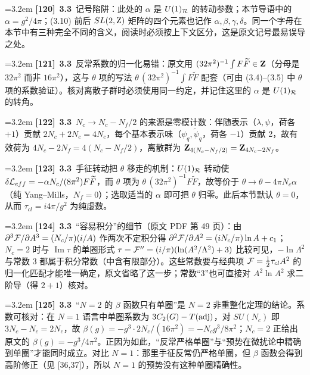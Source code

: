 \par
\par\medskip\noindent\hangindent=3.2em \textbf{[120]}~\textbf{3.3}~记号陷阱：此处的 $\alpha$ 是 $U(1)_{\cal R}$ 的转动参数；本节导语中的 $\alpha=g^2/4\pi$；(3.10) 前后 $SL(2,{\rm Z})$ 矩阵的四个元素也记作 $\alpha,\beta,\gamma,\delta$。同一个字母在本节中有三种完全不同的含义，阅读时必须按上下文区分，这是原文记号最易误导之处。
\par
\par\medskip\noindent\hangindent=3.2em \textbf{[121]}~\textbf{3.3}~反常系数的归一化易错：原文用 $(32\pi^2)^{-1}\int F\widetilde F\in{\bf Z}$（分母是 $32\pi^2$ 而非 $16\pi^2$），这与 $\theta$ 项的写法 $\theta\,(32\pi^2)^{-1}\int F\widetilde F$ 配套（可由 (3.4)--(3.5) 中 $\theta$ 项的系数验证）。核对离散子群时必须使用同一约定，并记住这里的 $\alpha$ 是 $U(1)_{\cal R}$ 的转角。
\par
\par\medskip\noindent\hangindent=3.2em \textbf{[122]}~\textbf{3.3}~$N_c\to N_c-N_f/2$ 的来源是零模计数：伴随表示（$\lambda,\psi$，荷各 $+1$）贡献 $2N_c+2N_c=4N_c$，每个基本表示味（$\psi_q,\widetilde\psi_q$，荷各 $-1$）贡献 2，故有效荷为 $4N_c-2N_f=4(N_c-N_f/2)$，离散群为 ${\bf Z}_{4(N_c-N_f/2)}={\bf Z}_{4N_c-2N_f}$。
\par
\par\medskip\noindent\hangindent=3.2em \textbf{[123]}~\textbf{3.3}~手征转动把 $\theta$ 移走的机制：$U(1)_{\cal R}$ 转动使 $\delta{\cal L}_{eff}=-\alpha N_c/(8\pi^2)F\widetilde F$，而 $\theta$ 项为 $\theta\,(32\pi^2)^{-1}F\widetilde F$，故等价于 $\theta\to\theta-4\pi N_c\alpha$（纯 Yang--Mills，$N_f=0$）；选取适当的 $\alpha$ 即可把 $\theta$ 归零。此后本节默认 $\theta=0$，从而 $\tau_{cl}=i4\pi/g^2$ 为纯虚数。
\par
\par\medskip\noindent\hangindent=3.2em \textbf{[124]}~\textbf{3.3}~“容易积分”的细节（原文 PDF 第 49 页）：由 $\partial^3{\cal F}/\partial A^3=(N_c/\pi)(i/A)$ 作两次不定积分得 $\partial^2{\cal F}/\partial A^2=(iN_c/\pi)\ln A+c_1$；$N_c=2$ 时与 $\operatorname{Im}\tau$ 的单圈形式 $\tau={\cal F}''=(i/\pi)(\ln(A^2/\Lambda^2)+3)$ 比较可见，$-\ln\Lambda^2$ 与常数 3 都属于积分常数（中含有限部分）。这些常数要与经典项 ${\cal F}=\frac12\tau_{cl}A^2$ 的归一化匹配才能唯一确定，原文省略了这一步；常数“3”也可直接对 $A^2\ln A^2$ 求二阶导（得 $2+1$）核对。
\par
\par\medskip\noindent\hangindent=3.2em \textbf{[125]}~\textbf{3.3}~“$N=2$ 的 $\beta$ 函数只有单圈”是 $N=2$ 非重整化定理的结论。系数可核对：在 $N=1$ 语言中单圈系数为 $3C_2(G)-T({\rm adj})$，对 $SU(N_c)$ 即 $3N_c-N_c=2N_c$，故 $\beta(g)=-g^3\cdot 2N_c/(16\pi^2)=-N_c g^3/8\pi^2$；$N_c=2$ 正给出原文的 $\beta(g)=-g^3/4\pi^2$。正因为如此，“反常严格单圈”与“预势在微扰论中精确到单圈”才能同时成立。对比 $N=1$：那里手征反常仍严格单圈，但 $\beta$ 函数会得到高阶修正（见 [36,37]），所以 $N=1$ 的预势没有这种单圈精确性。

